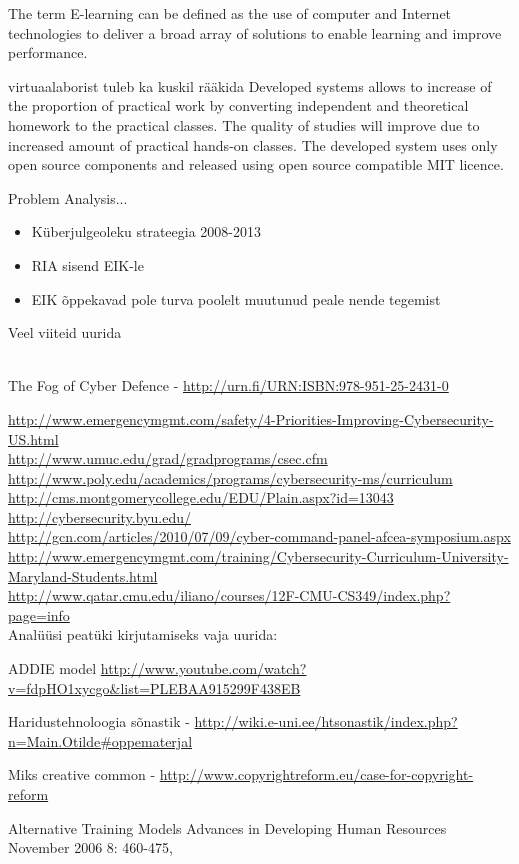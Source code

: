 The term E-learning can be defined as the use of computer and Internet technologies to deliver a broad array of solutions to enable learning and improve performance. \citep[p.~3]{food2011learning}

{\color{red} virtuaalaborist tuleb ka kuskil rääkida }
Developed systems allows to  increase of the proportion of practical work by converting independent and theoretical homework to  the practical classes. The quality of studies will improve due to increased amount of practical hands-on classes. The developed system uses only open source components and released using open source compatible MIT licence.

Problem Analysis...
\begin{itemize}
	\item Küberjulgeoleku strateegia 2008-2013
	\item RIA sisend EIK-le
	\item EIK õppekavad pole turva poolelt muutunud peale nende tegemist
\end{itemize}


Veel viiteid uurida 
{\scriptsize
\\

The Fog of Cyber Defence - \url{http://urn.fi/URN:ISBN:978-951-25-2431-0}

\url{http://www.emergencymgmt.com/safety/4-Priorities-Improving-Cybersecurity-US.html}\\
\url{http://www.umuc.edu/grad/gradprograms/csec.cfm}
\\
\url{http://www.poly.edu/academics/programs/cybersecurity-ms/curriculum}\\
\url{http://cms.montgomerycollege.edu/EDU/Plain.aspx?id=13043}\\
\url{http://cybersecurity.byu.edu/}\\
\url{http://gcn.com/articles/2010/07/09/cyber-command-panel-afcea-symposium.aspx}\\
\url{http://www.emergencymgmt.com/training/Cybersecurity-Curriculum-University-Maryland-Students.html}\\
\url{http://www.qatar.cmu.edu/iliano/courses/12F-CMU-CS349/index.php?page=info}\\
{\color{red} Analüüsi peatüki kirjutamiseks vaja uurida:}

ADDIE model \url{http://www.youtube.com/watch?v=fdpHO1xycgo&list=PLEBAA915299F438EB}


Haridustehnoloogia sõnastik - \url{http://wiki.e-uni.ee/htsonastik/index.php?n=Main.Otilde#oppematerjal}

Miks creative common - \url{http://www.copyrightreform.eu/case-for-copyright-reform}

Alternative Training Models
Advances in Developing Human Resources November 2006 8: 460-475,

}
